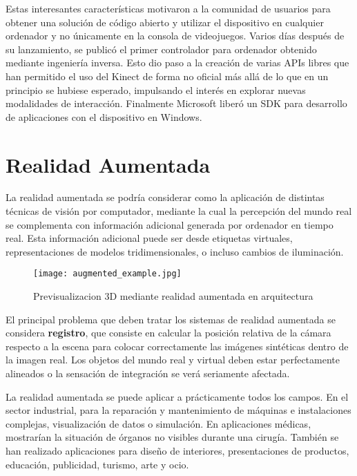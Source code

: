 Estas interesantes características motivaron a la comunidad de usuarios para obtener una solución de código abierto y utilizar el dispositivo en cualquier ordenador y no únicamente en la consola de videojuegos. Varios días después de su lanzamiento, se publicó el primer controlador para ordenador obtenido mediante ingeniería inversa. Esto dio paso a la creación de varias APIs libres que han permitido el uso del Kinect de forma no oficial más allá de lo que en un principio se hubiese esperado, impulsando el interés en explorar nuevas modalidades de interacción. Finalmente Microsoft liberó un SDK para desarrollo de aplicaciones con el dispositivo en Windows.  

\section{Realidad Aumentada}
La realidad aumentada se podría considerar como la aplicación de distintas técnicas de visión por computador, mediante la cual la percepción del mundo real se complementa con información adicional generada por ordenador en tiempo real. Esta información adicional puede ser desde etiquetas virtuales, representaciones de modelos tridimensionales, o incluso cambios de iluminación. 

\begin{figure}[h] 
  \centering
  \texttt{[image: augmented\_example.jpg]}
  \caption{Previsualizacion 3D mediante realidad aumentada en arquitectura}
  \label{fig:ar_example}
\end{figure} 

El principal problema que deben tratar los sistemas de realidad aumentada se considera \textbf{registro}, que consiste en calcular la posición relativa de la cámara respecto a la escena para colocar correctamente las imágenes sintéticas dentro de la imagen real. Los objetos del mundo real y virtual deben estar perfectamente alineados o la sensación de integración se verá seriamente afectada.

La realidad aumentada se puede aplicar a prácticamente todos los campos. En el sector industrial, para la reparación y mantenimiento de máquinas e instalaciones complejas, visualización de datos o simulación.  En aplicaciones médicas, mostrarían la situación de órganos no visibles durante una cirugía. También se han realizado aplicaciones para diseño de interiores, presentaciones de productos, educación, publicidad, turismo, arte y ocio. 


